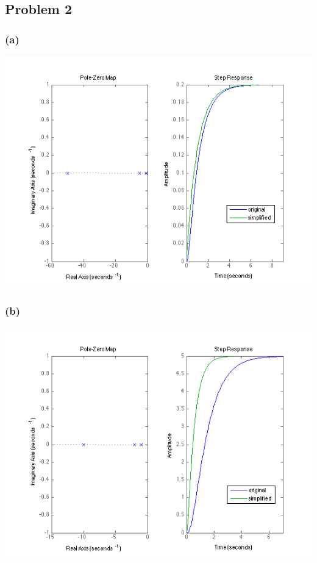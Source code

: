 \documentclass[letterpaper,10pt]{article}
\begin{document}
\subsection*{Problem 2}
\subsubsection*{(a)}
\begin{center}
	\includegraphics[scale=0.5]{homework03-2a.png}
\end{center}
\subsubsection*{(b)}
\begin{center}
	\includegraphics[scale=0.5]{homework03-2b.png}
\end{center}
\end{document}
